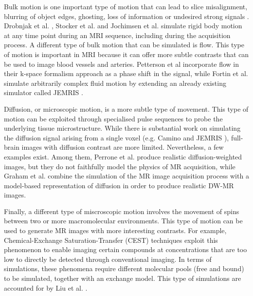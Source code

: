 \hfill

Bulk motion is one important type of motion that can lead to slice misalignment, blurring of object edges, ghosting, loss of information or undesired strong signals \cite{Zaitsev2015}.
Drobnjak et al. \cite{Drobnjak2006}, Stocker et al. \cite{Stocker2010} and Jochimsen et al. \cite{Jochimsen2004} simulate rigid body motion at any time point during an MRI sequence, including during the acquisition process.
A different type of bulk motion that can be simulated is flow.
This type of motion is important in MRI because it can offer more subtle contrasts that can be used to image blood vessels and arteries.
Petterson et al \cite{Petersson1993} incorporate flow in their k-space formalism approach as a phase shift in the signal, while 
Fortin et al. \cite{Fortin2016} simulate arbitrarily complex fluid motion by extending an already existing simulator called JEMRIS \cite{Stocker2010}.

\hfill

Diffusion, or microscopic motion, is a more subtle type of movement.
This type of motion can be exploited through specialised pulse sequences to probe the underlying tissue microstructure.
While there is substantial work on simulating the diffusion signal arising from a single voxel (e.g. Camino \cite{Cook2006} and JEMRIS \cite{Stocker2010}),
full-brain images with diffusion contrast are more limited.
Nevertheless, a few examples exist.
Among them, Perrone et al. \cite{Perrone2016} produce realistic diffusion-weighted images, but they do not faithfully model the physics of MR acquisition,
while Graham et al. \cite{Graham2016} combine the simulation of the MR image acquisition process with a model-based representation of diffusion in order to produce realistic DW-MR images.

\hfill

Finally, a different type of miscroscopic motion involves the movement of spins between two or more macromolecular environments.
This type of motion can be used to generate MR images with more interesting contrasts.
For example, Chemical-Exchange Saturation-Transfer (CEST) techniques exploit this phenomenon to enable imaging certain compounds at concentrations that are too low to directly be detected through conventional imaging.
In terms of simulations, these phenomena require different molecular pools (free and bound) to be simulated, together with an exchange model.
This type of simulations are accounted for by Liu et al. \cite{Liu2017}.

\hfill

